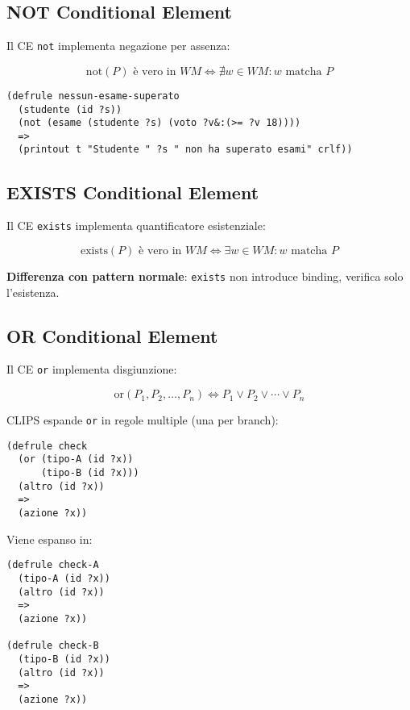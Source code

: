 \subsection{NOT Conditional Element}

Il CE \texttt{not} implementa negazione per assenza:

\begin{equation}
\text{not}(P) \text{ è vero in } WM \Leftrightarrow \nexists w \in WM: w \text{ matcha } P
\end{equation}

\begin{esempio}
\begin{lstlisting}[language=CLIPS]
(defrule nessun-esame-superato
  (studente (id ?s))
  (not (esame (studente ?s) (voto ?v&:(>= ?v 18))))
  =>
  (printout t "Studente " ?s " non ha superato esami" crlf))
\end{lstlisting}
\end{esempio}

\subsection{EXISTS Conditional Element}

Il CE \texttt{exists} implementa quantificatore esistenziale:

\begin{equation}
\text{exists}(P) \text{ è vero in } WM \Leftrightarrow \exists w \in WM: w \text{ matcha } P
\end{equation}

\textbf{Differenza con pattern normale}: \texttt{exists} non introduce binding, verifica solo l'esistenza.

\subsection{OR Conditional Element}

Il CE \texttt{or} implementa disgiunzione:

\begin{equation}
\text{or}(P_1, P_2, \ldots, P_n) \Leftrightarrow P_1 \lor P_2 \lor \cdots \lor P_n
\end{equation}

CLIPS espande \texttt{or} in regole multiple (una per branch):

\begin{esempio}[Espansione OR]
\begin{lstlisting}[language=CLIPS]
(defrule check
  (or (tipo-A (id ?x))
      (tipo-B (id ?x)))
  (altro (id ?x))
  =>
  (azione ?x))
\end{lstlisting}

Viene espanso in:
\begin{lstlisting}[language=CLIPS]
(defrule check-A
  (tipo-A (id ?x))
  (altro (id ?x))
  =>
  (azione ?x))

(defrule check-B
  (tipo-B (id ?x))
  (altro (id ?x))
  =>
  (azione ?x))
\end{lstlisting}
\end{esempio}

